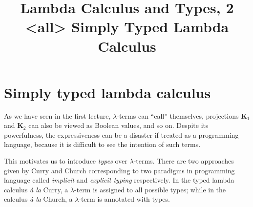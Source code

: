 \title{Lambda Calculus and Types, 2 \\<all>
  Simply Typed Lambda Calculus}

\begin{frame}
\maketitle
\end{frame}

\section{Simply typed lambda calculus}
As we have seen in the first lecture, $\lambda$-terms can ``call'' themselves,
projections $\mathbf{K}_1$ and $\mathbf{K}_2$ can also be viewed as Boolean
values, and so on. Despite its powerfulness, the expressiveness can be a
disaster if treated as a programming language, because it is difficult to see the
intention of such terms. 

This motivates us to introduce \emph{types} over $\lambda$-terms. There are two
approaches given by Curry and Church corresponding to
two paradigms in programming language called \emph{implicit} and \emph{explicit
  typing} respectively.  In the typed lambda calculus \emph{\`a la} Curry, a
$\lambda$-term is assigned to all possible types; while in the calculus
\emph{\`a la} Church, a $\lambda$-term is annotated with types. 

